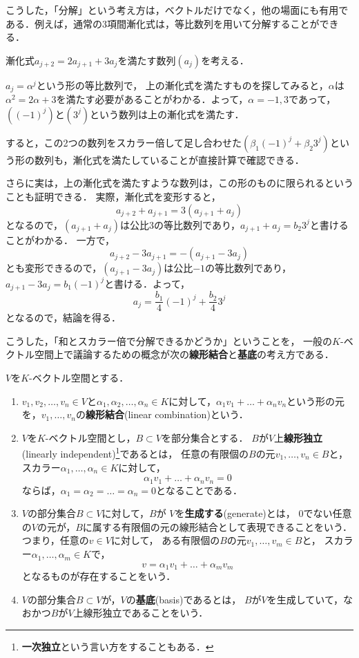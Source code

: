 こうした，「分解」という考え方は，ベクトルだけでなく，他の場面にも有用である．例えば，通常の3項間漸化式は，等比数列を用いて分解することができる．
\begin{example}
    漸化式$a_{j+2} = 2a_{j+1} + 3a_j$を満たす数列$(a_j)$を考える．
    
    $a_j = \alpha^j$という形の等比数列で，
    上の漸化式を満たすものを探してみると，$\alpha$は$\alpha^2 = 2\alpha + 3$を満たす必要があることがわかる．よって，$\alpha = -1,3$であって，
    $((-1)^j)$と$(3^j)$という数列は上の漸化式を満たす．
    
    すると，この2つの数列をスカラー倍して足し合わせた$(\beta_1 (-1)^j + \beta_2 3^j)$という形の数列も，漸化式を満たしていることが直接計算で確認できる．
    
    さらに実は，上の漸化式を満たすような数列は，この形のものに限られるということも証明できる．
    実際，漸化式を変形すると，
    \[
        a_{j+2} + a_{j+1} = 3(a_{j+1} + a_j)
    \]
    となるので，$(a_{j+1} + a_j)$は公比3の等比数列であり，$a_{j+1} + a_j = b_2 3^j$と書けることがわかる．
    一方で，
    \[
        a_{j+2} - 3a_{j+1} = -(a_{j+1} - 3a_j)
    \]
    とも変形できるので，$(a_{j+1}-3a_j)$は公比$-1$の等比数列であり，$a_{j+1}-3a_j = b_1 (-1)^j$と書ける．よって，
    \[
        a_j = \frac{b_1}{4} (-1)^j + \frac{b_2}{4} 3^j
    \]
    となるので，結論を得る．
\end{example}
こうした，「和とスカラー倍で分解できるかどうか」ということを，
一般の$K$-ベクトル空間上で議論するための概念が次の\textbf{線形結合}と\textbf{基底}の考え方である．
\begin{dfn}
    $V$を$K$-ベクトル空間とする．
    \begin{enumerate}
        \item $v_1,v_2,\dots,v_n \in V$と$\alpha_1,\alpha_2,\dots,\alpha_n \in K$に対して，$\alpha_1 v_1 + \dots + \alpha_n v_n$という形の元を，$v_1,\dots,v_n$の\textbf{線形結合}(linear combination)という．
        \item $V$を$K$-ベクトル空間とし，$B \subset V$を部分集合とする．
        $B$が$V$上\textbf{線形独立}(linearly independent)\footnote{\textbf{一次独立}という言い方をすることもある．}であるとは，
        任意の有限個の$B$の元$v_1,\dots,v_n \in B$と，
        スカラー$\alpha_1,\dots,\alpha_n \in K$に対して，
        \[
            \alpha_1 v_1 + \dots + \alpha_n v_n = 0
        \]
        ならば，$\alpha_1 = \alpha_2 = \dots = \alpha_n = 0$となることである．
        \item $V$の部分集合$B \subset V$に対して，$B$が $V$を\textbf{生成する}(generate)とは，
        $0$でない任意の$V$の元が，$B$に属する有限個の元の線形結合として表現できることをいう．
        つまり，任意の$v \in V$に対して，
        ある有限個の$B$の元$v_1,\dots,v_m \in B$と，
        スカラー$\alpha_1,\dots,\alpha_m \in K$で，
        \[
            v = \alpha_1 v_1 + \dots + \alpha_m v_m
        \]
        となるものが存在することをいう．
        \item $V$の部分集合$B \subset V$が，$V$の\textbf{基底}(basis)であるとは，
        $B$が$V$を生成していて，なおかつ$B$が$V$上線形独立であることをいう．
    \end{enumerate}
\end{dfn}
